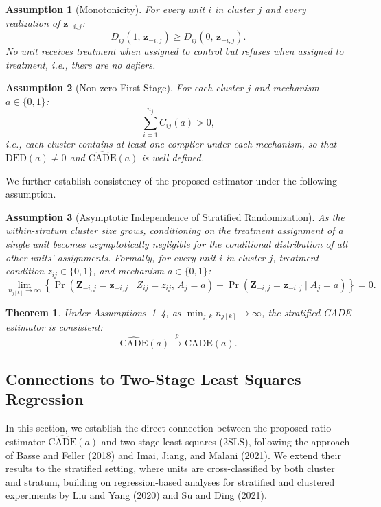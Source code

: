 \documentclass[a4paper, 12pt]{article}
\newtheorem{thm}{Theorem}
\newtheorem{assumption}{Assumption}
\begin{document}
\begin{assumption}[Monotonicity]\quad

For every unit $i$ in cluster $j$ and every realization of $\mathbf{z}_{-i,j}$:
$$D_{ij}(1,\, \mathbf{z}_{-i,j}) \geq D_{ij}(0,\, \mathbf{z}_{-i,j}).$$
No unit receives treatment when assigned to control but refuses when assigned to treatment, i.e., there are no defiers.
\end{assumption}

\begin{assumption}[Non-zero First Stage]\quad

For each cluster $j$ and mechanism $a \in \{0,1\}$:
$$\sum_{i=1}^{n_j} \bar{C}_{ij}(a) > 0,$$
i.e., each cluster contains at least one complier under each mechanism, so that $\mathrm{DED}(a) \neq 0$ and $\widehat{\mathrm{CADE}}(a)$ is well defined.
\end{assumption}

We further establish consistency of the proposed estimator under the following assumption.

\begin{assumption}[Asymptotic Independence of Stratified Randomization]\quad

As the within-stratum cluster size grows, conditioning on the treatment assignment of a single unit becomes asymptotically negligible for the conditional distribution of all other units' assignments. Formally, for every unit $i$ in cluster $j$, treatment condition $z_{ij} \in \{0,1\}$, and mechanism $a \in \{0,1\}$:
$$
\lim_{n_{j[k]}\to \infty} \left\{\Pr\!\left(\mathbf{Z}_{-i,j} = \mathbf{z}_{-i,j} \mid Z_{ij} = z_{ij},\, A_j=a\right) - \Pr\!\left(\mathbf{Z}_{-i,j} = \mathbf{z}_{-i,j} \mid A_j=a\right)\right\} = 0.
$$
\end{assumption}

\begin{thm}
Under Assumptions~1--4, as $\min_{j,k} n_{j[k]} \to \infty$, the stratified CADE estimator is consistent:
$$
\widehat{\mathrm{CADE}}(a) \xrightarrow{p} \mathrm{CADE}(a).
$$
\end{thm}

\subsection{Connections to Two-Stage Least Squares Regression}

In this section, we establish the direct connection between the proposed ratio estimator $\widehat{\mathrm{CADE}}(a)$ and two-stage least squares (2SLS), following the approach of Basse and Feller (2018) and Imai, Jiang, and Malani (2021). We extend their results to the stratified setting, where units are cross-classified by both cluster and stratum, building on regression-based analyses for stratified and clustered experiments by Liu and Yang (2020) and Su and Ding (2021).
\end{document}
